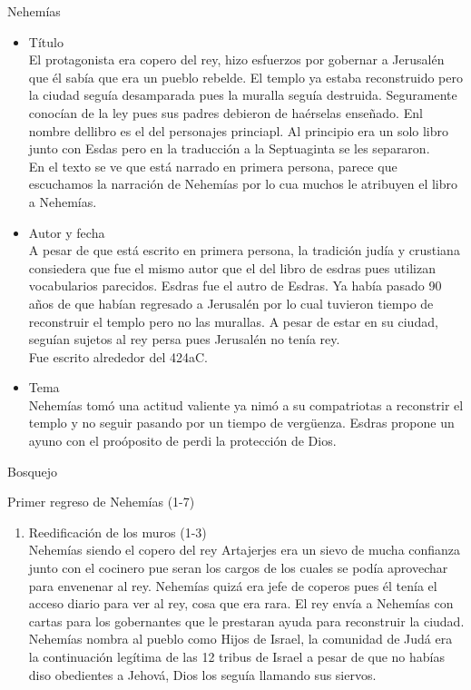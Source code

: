 \documentclass[12pt]{article}
\begin{document}
\begin{section}{Nehemías}
	\begin{itemize}
		\item Título\\
			El protagonista era copero del rey, hizo esfuerzos por gobernar a Jerusalén que él sabía que era un pueblo rebelde. El templo ya estaba reconstruido pero la ciudad seguía desamparada pues la muralla seguía destruida. Seguramente conocían de la ley pues sus padres debieron de haérselas enseñado. Enl nombre dellibro es el del personajes princiapl. Al principio era un solo libro junto con Esdas pero en la traducción a la Septuaginta se les separaron.\\
			En el texto se ve que está narrado en primera persona, parece que escuchamos la narración de Nehemías por lo cua muchos le atribuyen el libro a Nehemías.
		\item Autor y fecha\\
			A pesar de que está escrito en primera persona, la tradición judía y crustiana consiedera que fue el mismo autor que el del libro de esdras pues utilizan vocabularios parecidos. Esdras fue el autro de Esdras. Ya había pasado 90 años de que habían regresado a Jerusalén por lo cual tuvieron tiempo de reconstruir el templo pero no las murallas. A pesar de estar en su ciudad, seguían sujetos al rey persa pues Jerusalén no tenía rey.\\
			Fue escrito alrededor del 424aC.
		\item Tema\\
			Nehemías tomó una actitud valiente ya nimó a su compatriotas a reconstrir el templo y no seguir pasando por un tiempo de vergüenza. Esdras propone un ayuno con el proóposito de perdi la protección de Dios.
	\end{itemize}
	\begin{subsection}{Bosquejo}
		\begin{subsubsection}{Primer regreso de Nehemías (1-7)}
			\begin{enumerate}
				\item Reedificación de los muros (1-3)\\
					Nehemías siendo el copero del rey Artajerjes era un sievo de mucha confianza junto con el cocinero pue seran los cargos de los cuales se podía aprovechar para envenenar al rey. Nehemías quizá era jefe de coperos pues él tenía el acceso diario para ver al rey, cosa que era rara. El rey envía a Nehemías con cartas para los gobernantes que le prestaran ayuda para reconstruir la ciudad. Nehemías nombra al pueblo como Hijos de Israel, la comunidad de Judá era la continuación legítima de las 12 tribus de Israel a pesar de que no habías diso obedientes a Jehová, Dios los seguía llamando sus siervos.\\

\end{enumerate}
\end{subsubsection}
\end{subsection}
\end{section}
\end{document}
